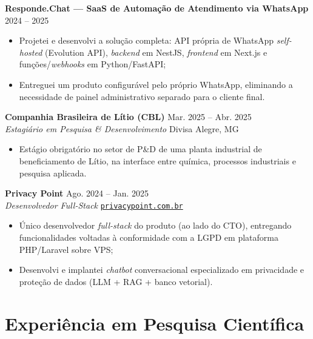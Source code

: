 \documentclass[10pt,a4paper]{article}
\newcommand{\entry}[4]{%
  \textbf{\sffamily\large #1} \hfill #2 \\
  {\itshape #3} \hfill {\small #4} \\[-0.75em]
}
\newcommand{\subentry}[2]{%
  \hspace{0.4em}\textbf{\sffamily #1} \hfill {\small #2}\\[-0.55em]
}
\newcommand*{\link}[2]{\href{#1}{{\texttt{#2}}}}
\begin{document}
\subentry{Responde.Chat --- SaaS de Automação de Atendimento via WhatsApp}{2024 -- 2025}
\begin{itemize}[leftmargin=2.2em]\footnotesize
  \item Projetei e desenvolvi a solução completa: API própria de WhatsApp \textit{self-hosted} (Evolution API), \textit{backend} em NestJS, \textit{frontend} em Next.js e funções/\textit{webhooks} em Python/FastAPI;
  \item Entreguei um produto configurável pelo próprio WhatsApp, eliminando a necessidade de painel administrativo separado para o cliente final.
\end{itemize}

\vspace{0.7em}

\entry{Companhia Brasileira de Lítio (CBL)}{Mar. 2025 -- Abr. 2025}{Estagiário em Pesquisa \& Desenvolvimento}{Divisa Alegre, MG}
\begin{itemize}\footnotesize
  \item Estágio obrigatório no setor de P\&D de uma planta industrial de beneficiamento de Lítio, na interface entre química, processos industriais e pesquisa aplicada.
\end{itemize}

\vspace{0.7em}

\entry{Privacy Point}{Ago. 2024 -- Jan. 2025}{Desenvolvedor Full-Stack}{\link{https://privacypoint.com.br}{privacypoint.com.br}}
\begin{itemize}\footnotesize
  \item Único desenvolvedor \textit{full-stack} do produto (ao lado do CTO), entregando funcionalidades voltadas à conformidade com a LGPD em plataforma PHP/Laravel sobre VPS;
  \item Desenvolvi e implantei \textit{chatbot} conversacional especializado em privacidade e proteção de dados (LLM + RAG + banco vetorial).
\end{itemize}

\section*{Experiência em Pesquisa Científica}
\end{document}
